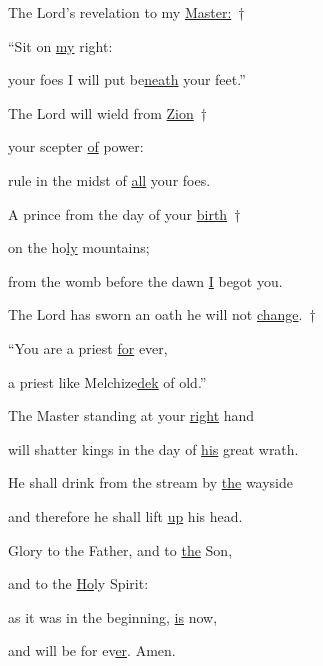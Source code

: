 
\noindent The Lord’s revelation to my \uline{Master:}~†~\nopagebreak

“Sit on \uline{my} right:~\GreStar{}~\nopagebreak

your foes I will put be\uline{neath} your feet.”

\noindent The Lord will wield from \uline{Zion}~†~\nopagebreak

your scepter \uline{of} power:~\GreStar{}~\nopagebreak

rule in the midst of \uline{all} your foes.

\noindent A prince from the day of your \uline{birth}~†~\nopagebreak

on the ho\uline{ly} mountains;~\GreStar{}~\nopagebreak

from the womb before the dawn \uline{I} begot you.

\noindent The Lord has sworn an oath he will not \uline{change}.~†~\nopagebreak

“You are a priest \uline{for} ever,~\GreStar{}~\nopagebreak

a priest like Melchize\uline{dek} of old.”

\noindent The Master standing at your \uline{right} hand~\GreStar{}~\nopagebreak

will shatter kings in the day of \uline{his} great wrath.

\noindent He shall drink from the stream by \uline{the} wayside~\GreStar{}~\nopagebreak

and therefore he shall lift \uline{up} his head.

\noindent Glory to the Father, and to \uline{the} Son,~\GreStar{}~\nopagebreak

and to the \uline{Ho}ly Spirit:

\noindent as it was in the beginning, \uline{is} now,~\GreStar{}~\nopagebreak

and will be for ev\uline{er}. Amen.
